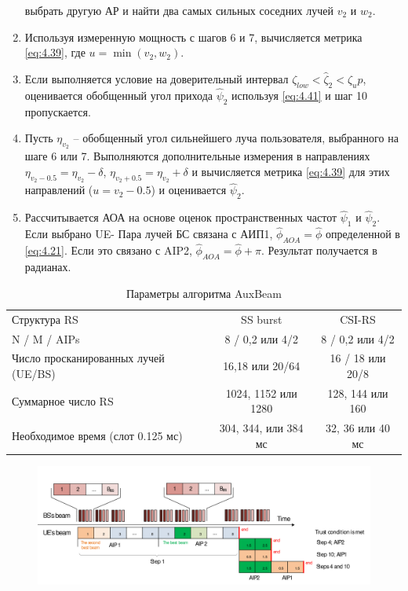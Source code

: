 \begin{enumerate}[label=\textbf{Шаг \arabic*:}]
          выбрать другую АР и найти два самых сильных соседних лучей $v_2$ и $w_2$.
    \item Используя измеренную мощность с шагов 6 и 7, вычисляется метрика \eqref{eq:4.39},
          где $u=\min(v_2,w_2)$.
    \item Если выполняется условие на доверительный интервал $\zeta_{low} < \hat \zeta_2 < \zeta_up$,
          оценивается обобщенный угол прихода $\hat \psi_2$ используя \eqref{eq:4.41} и шаг 10 пропускается.
    \item Пусть $\eta_{v_2}$ -- обобщенный угол сильнейшего луча пользователя, выбранного на шаге 6 или 7.
          Выполняются дополнительные измерения в направлениях
          $\eta_{v_2 - 0.5} = \eta_{v_2} - \delta$,
          $\eta_{v_2 + 0.5} = \eta_{v_2} + \delta$ и вычисляется метрика \eqref{eq:4.39}
          для этих направлений ($u=v_2 - 0.5$) и оценивается $\hat \psi_2$.
    \item Рассчитывается АОА на основе оценок пространственных частот $\hat \psi_1$ и
          $\hat \psi_2$. Если выбрано UE- Пара лучей БС связана с АИП1, $\hat \phi_{AOA}=\hat \phi$
          определенной в \eqref{eq:4.21}.
          Если это связано с AIP2, $\hat \phi_{AOA} = \hat\phi + \pi$. Результат
          получается в радианах.
\end{enumerate}

\begin{table}
    \centering
    \caption{Параметры алгоритма AuxBeam}
    \begin{tabular}{lcc}
        \toprule
        \midrule
        Структура RS                         & SS burst             & CSI-RS            \\
        N / M / AIPs                         & 8 / 0,2  или 4/2     & 8 / 0,2 или 4/2   \\
        Число просканированных лучей (UE/BS) & 16,18 или 20/64      & 16 / 18  или 20/8 \\
        Суммарное число RS                   & 1024, 1152 или 1280  & 128, 144 или 160  \\
        Необходимое время (слот 0.125 мс)    & 304, 344, или 384 мс & 32, 36 или 40 мс  \\
        \hline
    \end{tabular}
\end{table}
\begin{figure}[h!]
    \centering
    \includegraphics[width=\linewidth]{figs/fig4.26}
    \caption{}
    \label{fig:4.26}
\end{figure}

